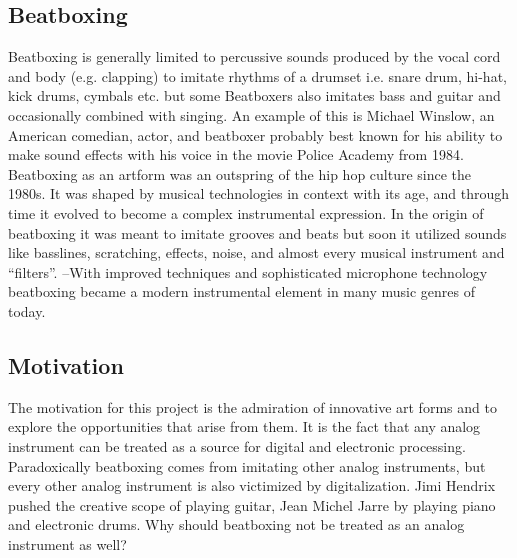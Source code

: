 \subsection{ Beatboxing }
Beatboxing is generally limited to percussive sounds produced by the vocal cord and body (e.g. clapping) to imitate rhythms of a drumset i.e. snare drum, hi-hat, kick drums, cymbals etc. but some Beatboxers also imitates bass and guitar and occasionally combined with singing. An example of this is Michael Winslow, an American comedian, actor, and beatboxer probably best known for his ability to make sound effects with his voice in the movie Police Academy from 1984. Beatboxing as an artform was an outspring of the hip hop culture since the 1980s. It was shaped by musical technologies in context with its age, and through time it evolved to become a complex instrumental expression. In the origin of beatboxing it was meant to imitate grooves and beats but soon it utilized sounds like basslines, scratching, effects, noise, and almost every musical instrument and “filters”. –With improved techniques and sophisticated microphone technology beatboxing became a modern instrumental element in many music genres of today.

\subsection{ Motivation }
The motivation for this project is the admiration of innovative art forms and to explore the opportunities that arise from them. It is the fact that any analog instrument can be treated as a source for digital and electronic processing. Paradoxically beatboxing comes from imitating other analog instruments, but every other analog instrument is also victimized by digitalization. Jimi Hendrix pushed the creative scope of playing guitar, Jean Michel Jarre by playing piano and electronic drums. Why should beatboxing not be treated as an analog instrument as well? 
